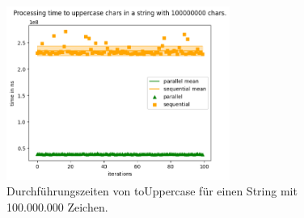 \documentclass[plainarticle,zihtitle,german,final,hyperref,utf8]{zihpub}
\begin{document}
\begin{figure}[h]
\begin{center}
	\includegraphics[width=0.65\textwidth]{images/comp_upper_100000000.png}
	\caption{Durchführungszeiten von toUppercase für einen String mit 100.000.000 Zeichen.}
\end{center}
\end{figure}

\clearpage
\end{document}
